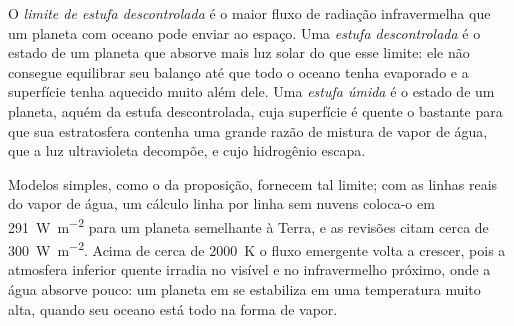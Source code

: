 \begin{definition}\label{def:b3:planetary-atmospheres:runaway}
O \emph{limite de estufa descontrolada} é o
maior fluxo de radiação infravermelha que um planeta com oceano pode enviar ao
espaço. Uma \emph{estufa descontrolada} é o estado
de um planeta que absorve mais luz solar do que esse limite: ele não consegue equilibrar
seu balanço até que todo o oceano tenha evaporado e a superfície tenha
aquecido muito além dele. Uma \emph{estufa úmida}
é o estado de um planeta, aquém da estufa descontrolada, cuja superfície é quente o bastante
para que sua estratosfera contenha uma grande razão de mistura de vapor de água,
que a luz ultravioleta decompõe, e cujo hidrogênio escapa.
\end{definition}

Modelos simples, como o da proposição, fornecem tal limite; com as linhas reais
do vapor de água, um cálculo linha por linha sem nuvens coloca-o em
\qty{291}{W.m^{-2}} para um planeta semelhante à Terra, e
as revisões citam cerca de \qty{300}{W.m^{-2}}. Acima de cerca de \qty{2000}{K} o
fluxo emergente volta a crescer, pois a atmosfera inferior quente irradia no
visível e no infravermelho próximo, onde a água absorve pouco: um planeta
em  se estabiliza em uma temperatura muito alta, quando seu oceano
está todo na forma de vapor.

